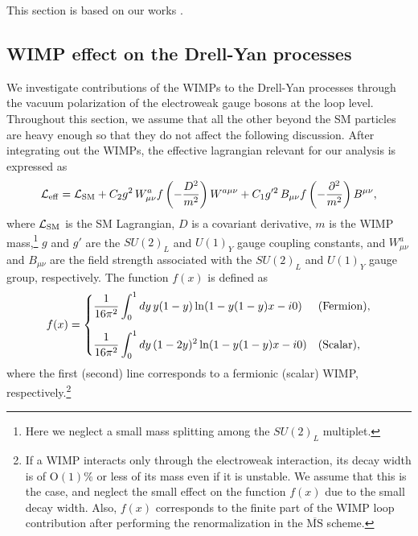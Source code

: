 \documentclass[12pt,twoside,book]{article}
\begin{document}
This section is based on our works \cite{Chigusa:2018vxz, Abe:2019egv}.


\subsection{WIMP effect on the Drell-Yan processes}
\label{sec:WIMP}

We investigate contributions of the WIMPs to the Drell-Yan processes through the vacuum polarization of the electroweak gauge bosons at the loop level.
Throughout this section, we assume that all the other beyond the SM particles are heavy enough so that they do not affect the following discussion.
After integrating out the WIMPs, the effective lagrangian relevant for our analysis is expressed as
\begin{align}
 \mathcal{L}_{\rm eff} = \mathcal{L}_{\rm SM} + C_2 g^2\, W_{\mu \nu}^a
 f\left(-\frac{D^2}{m^2}\right) W^{a\mu\nu} + C_1 g'^2\, B_{\mu\nu}
 f\left(-\frac{\partial^2}{m^2}\right) B^{\mu\nu},\label{eq_lag}
\end{align}
where $\mathcal{L}_{\rm SM}$ is the SM Lagrangian, $D$ is a covariant derivative, $m$ is the WIMP mass,\footnote
{
  Here we neglect a small mass splitting among the $SU(2)_L$ multiplet.
}
$g$ and $g'$ are the $SU(2)_L$ and $U(1)_Y$ gauge coupling constants, and $W_{\mu\nu}^a$ and $B_{\mu\nu}$ are the field strength associated with the $SU(2)_L$ and $U(1)_Y$ gauge group, respectively.
The function $f(x)$ is defined as \cite{Matsumoto:2017vfu}
\begin{align}
 f(x) = \begin{cases}
	 \displaystyle{\frac{1}{16\pi^2} \int_0^1 dy\, y(1-y) \ln (1 -
	 y(1-y)x - i0)} & {\rm (Fermion)},\\[5mm]
	 \displaystyle{\frac{1}{16\pi^2} \int_0^1 dy\, (1-2y)^2 \ln (1-
	 y(1-y)x - i0)} & {\rm (Scalar)},
	\end{cases}\label{eq_f}
\end{align}
where the first (second) line corresponds to a fermionic (scalar) WIMP, respectively.\footnote
{
  If a WIMP interacts only through the electroweak interaction, its decay width is of $\mathrm{O}(1)\%$ or less of its mass even if it is unstable.
  We assume that this is the case, and neglect the small effect on the function $f(x)$ due to the small decay width.
  Also, $f(x)$ corresponds to the finite part of the WIMP loop contribution after performing the renormalization in the $\overline{\mathrm{MS}}$ scheme.
}
\end{document}
